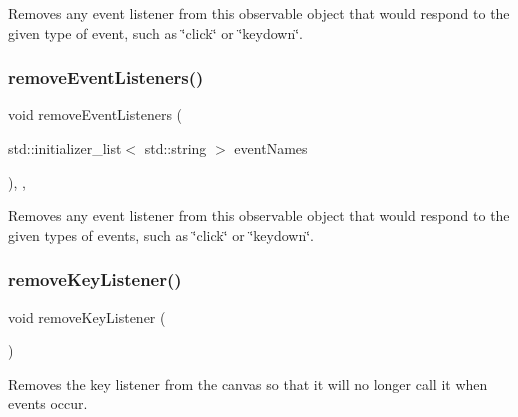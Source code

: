 Removes any event listener from this observable object that would respond to the given type of event, such as \char`\"{}click\char`\"{} or \char`\"{}keydown\char`\"{}. 

\mbox{\label{classGObservable_af51cc35c29a1bd1908609d432decdbb6}} 
\subsubsection{\texorpdfstring{remove\+Event\+Listeners()}{removeEventListeners()}}
{\footnotesize\ttfamily void remove\+Event\+Listeners (\begin{DoxyParamCaption}\item[{std\+::initializer\+\_\+list$<$ std\+::string $>$}]{event\+Names }\end{DoxyParamCaption})\hspace{0.3cm}{\ttfamily [protected]}, {\ttfamily [virtual]}, {\ttfamily [inherited]}}



Removes any event listener from this observable object that would respond to the given types of events, such as \char`\"{}click\char`\"{} or \char`\"{}keydown\char`\"{}. 

\mbox{\label{classGCanvas_a43095f41cab3be732b49f29970484b05}} 
\subsubsection{\texorpdfstring{remove\+Key\+Listener()}{removeKeyListener()}}
{\footnotesize\ttfamily void remove\+Key\+Listener (\begin{DoxyParamCaption}{ }\end{DoxyParamCaption})\hspace{0.3cm}{\ttfamily [virtual]}}



Removes the key listener from the canvas so that it will no longer call it when events occur. 

\mbox{\label{classGCanvas_aff47f71ce47e688a07c9d38dc92fcc11}} 
